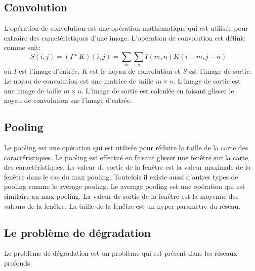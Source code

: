 \documentclass{article}
\begin{document}
\subsection{Convolution}
L'opération de convolution est une opération mathématique qui est utilisée pour extraire des caractéristiques d'une image.
L'opération de convolution est définie comme suit:
\begin{equation}
    S(i, j) = (I * K)(i, j) = \sum_{m} \sum_{n} I(m, n)K(i - m, j - n)
\end{equation}
où $I$ est l'image d'entrée, $K$ est le noyau de convolution et $S$ est l'image de sortie.
Le noyau de convolution est une matrice de taille $m \times n$.
L'image de sortie est une image de taille $m \times n$.
L'image de sortie est calculée en faisant glisser le noyau de convolution sur l'image d'entrée.

\subsection{Pooling}
Le pooling est une opération qui est utilisée pour réduire la taille de la carte des caractéristiques.
Le pooling est effectué en faisant glisser une fenêtre sur la carte des caractéristiques.
La valeur de sortie de la fenêtre est la valeur maximale de la fenêtre dans le cas du max pooling.
Toutefois il existe aussi d'autres types de pooling comme le average pooling.
Le average pooling est une opération qui est similaire au max pooling.
La valeur de sortie de la fenêtre est la moyenne des valeurs de la fenêtre.
La taille de la fenêtre est un hyper paramètre du réseau.

\subsection{Le problème  de dégradation}
Le problème de dégradation est un problème qui est présent dans les réseaux profonds.
\end{document}
